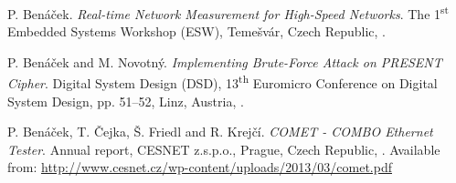 \begin{thebibliography}{A.9}
P. Ben\'{a}\v{c}ek.
\newblock \textit{Real-time Network Measurement for High-Speed Networks}.
\newblock The 1\textsuperscript{st} Embedded Systems Workshop (ESW), Teme\v{s}v\'{a}r, Czech Republic,
.


\end{thebibliography}

\renewcommand\bibname{Remaining Publications of the Author}
\begin{thebibliography}{A.9}%

P. Ben\'{a}\v{c}ek and M. Novotn\'{y}.
\newblock \textit{Implementing Brute-Force Attack on PRESENT Cipher}.
\newblock Digital System Design (DSD), 13\textsuperscript{th} Euromicro Conference on Digital System Design, pp. 51--52, Linz, Austria,
.

P. Ben\'{a}\v{c}ek, T. \v{C}ejka, \v{S}. Friedl and R. Krej\v{c}\'{i}.
\newblock \textit{COMET - COMBO Ethernet Tester}.
\newblock Annual report, CESNET z.s.p.o., Prague, Czech Republic,
.
\newblock Available from: \url{http://www.cesnet.cz/wp-content/uploads/2013/03/comet.pdf}

\end{thebibliography}


